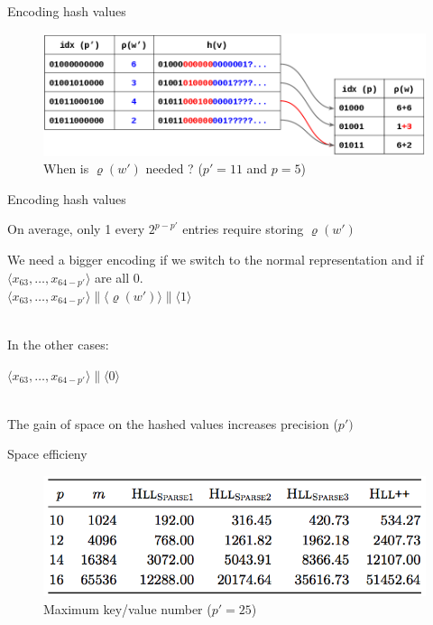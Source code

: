 \documentclass{beamer}
\begin{document}
\begin{frame}{Encoding hash values}
\begin{figure}[c]
\includegraphics[scale=0.45]{encoding_hash.png}
\caption{When is $\varrho(w\prime)$ needed ? ($p' = 11$ and $p = 5$)}
\end{figure}
\end{frame}

\begin{frame}{Encoding hash values}

  On average, only 1 every $2^{p-p\prime} $ entries require storing $\varrho(w\prime)$

  We need a bigger encoding if we switch to the normal representation
  and if $\langle x_{63}, \dots, x_{64-p\prime} \rangle$ are all 0.
  ~\\
  \colorbox{light-gray}{$\langle x_{63}, \dots, x_{64-p\prime} \rangle \| \langle \varrho (w\prime) \rangle \| \langle 1 \rangle $}

  ~\\
  In the other cases:

  \colorbox{light-gray}{$\langle x_{63}, \dots, x_{64-p\prime} \rangle \| \langle 0 \rangle $}

  ~\\
  The gain of space on the hashed values increases precision ($p\prime)$

\end{frame}



\begin{frame}{Space efficieny}
  
  \begin{figure}[c]
    \includegraphics [scale=0.45]  {sparse_all.png}
    \caption{Maximum key/value number ($p' = 25$)}
  \end{figure}
\end{frame}
\end{document}
